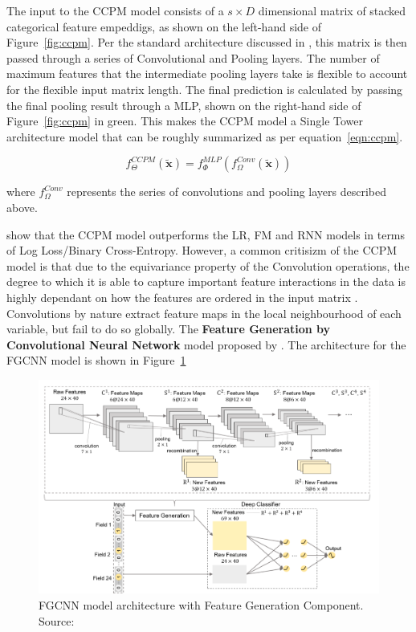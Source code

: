 \documentclass{mldsmsc}
\begin{document}
The input to the CCPM model consists of a $s \times D$ dimensional matrix of stacked categorical
feature empeddigs, as shown on the left-hand side of Figure~\ref{fig:ccpm}. Per the standard
architecture discussed in \citep{RefWorks:liu2015convolutional}, this matrix is then passed through
a series of Convolutional and Pooling layers. The number
of maximum features that the intermediate pooling layers take is flexible to account for the
flexible input matrix length. The final prediction is calculated by passing the final
pooling result through a MLP, shown on the right-hand side of Figure~\ref{fig:ccpm} in green.
This makes the CCPM model a Single Tower architecture model that can be roughly summarized
as per equation~\ref{eqn:ccpm}.

\begin{equation}\label{eqn:ccpm}
    f_{\Theta}^{CCPM}(\tilde{\mathbf{x}}) = f_{\Phi}^{MLP}(f_{\Omega}^{Conv}(\tilde{\mathbf{x}}))
\end{equation}

where $f_{\Omega}^{Conv}$ represents the series of convolutions and pooling layers described above.

\cite{RefWorks:liu2015convolutional} show that the CCPM model outperforms the LR, FM and RNN models
in terms of Log Loss/Binary Cross-Entropy. However, a common critisizm of the CCPM model is that
due to the equivariance property of the Convolution operations, the degree to which it is able to capture
important feature interactions in the data is highly dependant on how the features are ordered in the
input matrix \citep{RefWorks:zhang2021deep,RefWorks:qu2018product-based,RefWorks:gu2021ad}. Convolutions
by nature extract feature maps in the local neighbourhood of each variable, but fail to do so globally.
The \textbf{Feature Generation by Convolutional Neural Network} model proposed by \cite{RefWorks:liu2019feature}.
The architecture for the FGCNN model is shown in Figure~\ref{fig:fgcnn}

\begin{figure}[h]
    \centering
    \includegraphics[width=\textwidth]{../figures/fgcnn.png}
    \caption{FGCNN model architecture with Feature Generation Component. Source: \citep{RefWorks:liu2019feature}}
    \label{fig:fgcnn}
\end{figure}
\end{document}
